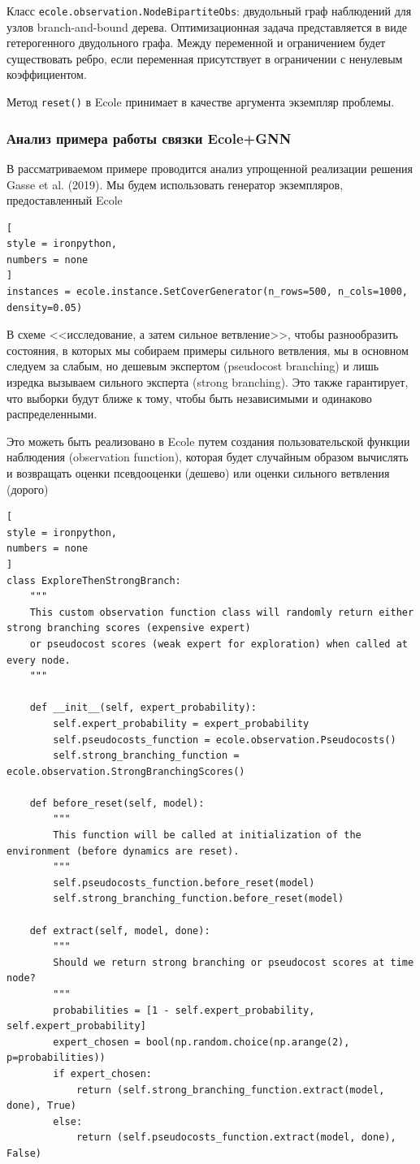 \documentclass[%
	11pt,
	a4paper,
	utf8,
		]{article}
\begin{document}
Класс \texttt{ecole.observation.NodeBipartiteObs}: двудольный граф наблюдений для узлов branch-and-bound дерева. Оптимизационная задача представляется в виде гетерогенного двудольного графа. Между переменной и ограничением будет существовать ребро, если переменная присутствует в ограничении с ненулевым коэффициентом.

Метод \texttt{reset()} в Ecole принимает в качестве аргумента экземпляр проблемы. 

\subsubsection{Анализ примера работы связки Ecole+GNN}

В рассматриваемом примере проводится анализ упрощенной реализации решения Gasse et al. (2019). Мы будем использовать генератор экземпляров, предоставленный Ecole
\begin{lstlisting}[
style = ironpython,
numbers = none
]
instances = ecole.instance.SetCoverGenerator(n_rows=500, n_cols=1000, density=0.05)
\end{lstlisting}

В схеме <<исследование, а затем сильное ветвление>>, чтобы разнообразить состояния, в которых мы собираем примеры сильного ветвления, мы в основном следуем за слабым, но дешевым экспертом (pseudocost branching) и лишь изредка вызываем сильного эксперта (strong branching). Это также гарантирует, что выборки будут ближе к тому, чтобы быть независимыми и одинаково распределенными.

Это можеть быть реализовано в Ecole путем создания пользовательской функции наблюдения (observation function), которая будет случайным образом вычислять и возвращать оценки псевдооценки (дешево) или оценки сильного ветвления (дорого)
\begin{lstlisting}[
style = ironpython,
numbers = none	
]
class ExploreThenStrongBranch:
	"""
	This custom observation function class will randomly return either strong branching scores (expensive expert)
	or pseudocost scores (weak expert for exploration) when called at every node.
	"""

	def __init__(self, expert_probability):
		self.expert_probability = expert_probability
		self.pseudocosts_function = ecole.observation.Pseudocosts()
		self.strong_branching_function = ecole.observation.StrongBranchingScores()

	def before_reset(self, model):
		"""
		This function will be called at initialization of the environment (before dynamics are reset).
		"""
		self.pseudocosts_function.before_reset(model)
		self.strong_branching_function.before_reset(model)

	def extract(self, model, done):
		"""
		Should we return strong branching or pseudocost scores at time node?
		"""
		probabilities = [1 - self.expert_probability, self.expert_probability]
		expert_chosen = bool(np.random.choice(np.arange(2), p=probabilities))
		if expert_chosen:
			return (self.strong_branching_function.extract(model, done), True)
		else:
			return (self.pseudocosts_function.extract(model, done), False)
\end{lstlisting}
\end{document}
